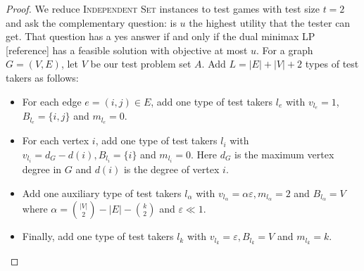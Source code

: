 \documentclass{article}
\begin{document}
\begin{proof}
We reduce \textsc{Independent Set} instances to test games with test size $t=2$
and ask the complementary question: is $u$ the highest utility that the tester
can get. That question has a yes answer if and only if the dual minimax LP
[reference] has a feasible solution with objective at most $u$. For a graph $G
= (V, E)$, let $V$ be our test problem set $A$. Add $L = |E|+|V|+2$ types of
test takers as follows:

\begin{itemize}

\item For each edge $e = (i, j) \in E$, add one type of test takers $l_e$ with
$v_{l_e} = 1$, $B_{l_e} = \{i, j\}$ and $m_{l_e} = 0$.

\item For each vertex $i$, add one type of test takers $l_i$ with $v_{l_i} =
d_G-d(i), B_{l_i} = \{i\}$ and $m_{l_i} = 0$. Here $d_G$ is the maximum vertex
degree in $G$ and $d(i)$ is the degree of vertex $i$. 

\item Add one auxiliary type of test takers $l_\alpha$ with $v_{l_\alpha} =
\alpha \varepsilon, m_{l_\alpha} = 2$ and $B_{l_\alpha} = V$ where $\alpha =
\binom{|V|}{2} - |E|-\binom{k}{2}$ and $\varepsilon \ll 1$. 

\item Finally, add one type of test takers $l_k$ with $v_{l_k} =
\varepsilon, B_{l_k} = V$ and $m_{l_k} = k$.

\end{itemize}


\end{proof}
\end{document}

